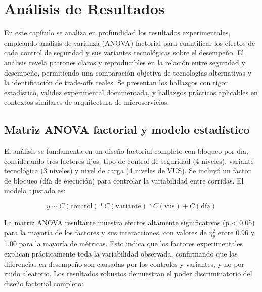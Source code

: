 \chapter{Análisis de Resultados}
\label{cap:analisisresultados}

En este capítulo se analiza en profundidad los resultados experimentales, empleando análisis de varianza (ANOVA) factorial para cuantificar los efectos de cada control de seguridad y sus variantes tecnológicas sobre el desempeño. El análisis revela patrones claros y reproducibles en la relación entre seguridad y desempeño, permitiendo una comparación objetiva de tecnologías alternativas y la identificación de trade-offs reales. Se presentan los hallazgos con rigor estadístico, validez experimental documentada, y hallazgos prácticos aplicables en contextos similares de arquitectura de microservicios.

\section{Matriz ANOVA factorial y modelo estadístico}

El análisis se fundamenta en un diseño factorial completo con bloqueo por día, considerando tres factores fijos: tipo de control de seguridad (4 niveles), variante tecnológica (3 niveles) y nivel de carga (4 niveles de VUS). Se incluyó un factor de bloqueo (día de ejecución) para controlar la variabilidad entre corridas. El modelo ajustado es:

\begin{equation*}
y \sim C(\text{control}) * C(\text{variante}) * C(\text{vus}) + C(\text{día})
\end{equation*}

La matriz ANOVA resultante muestra efectos altamente significativos (p < 0.05) para la mayoría de los factores y sus interacciones, con valores de $\eta^2_p$ entre 0.96 y 1.00 para la mayoría de métricas. Esto indica que los factores experimentales explican prácticamente toda la variabilidad observada, confirmando que las diferencias en desempeño son causadas por los controles y variantes, y no por ruido aleatorio. Los resultados robustos demuestran el poder discriminatorio del diseño factorial completo:

